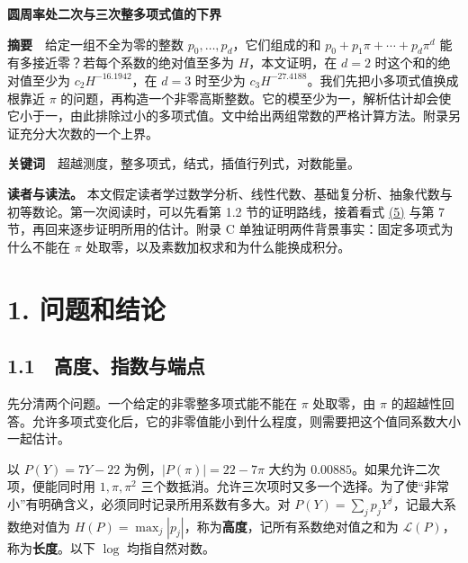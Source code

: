 \documentclass[11pt,a4paper]{article}
\begin{document}
\thispagestyle{plain}
\begin{center}{\LARGE\sffamily\bfseries\color{heading}圆周率处二次与三次整多项式值的下界\par}\vspace{.6em}{\large 本科生阐释版\par}\vspace{.35em}{\small 2026 年 11 月 19 日\par}\end{center}
\textbf{摘要}　给定一组不全为零的整数 \(p_0,\ldots,p_d\)，它们组成的和 \(p_0+p_1\pi+\cdots+p_d\pi^d\) 能有多接近零？若每个系数的绝对值至多为 \(H\)，本文证明，在 \(d=2\) 时这个和的绝对值至少为 \(c_2 H^{-16.1942}\)，在 \(d=3\) 时至少为 \(c_3 H^{-27.4188}\)。我们先把小多项式值换成根靠近 \(\pi\) 的问题，再构造一个非零高斯整数。它的模至少为一，解析估计却会使它小于一，由此排除过小的多项式值。文中给出两组常数的严格计算方法。附录另证充分大次数的一个上界。

\textbf{关键词}　超越测度，整多项式，结式，插值行列式，对数能量。

\textbf{读者与读法。} 本文假定读者学过数学分析、线性代数、基础复分析、抽象代数与初等数论。第一次阅读时，可以先看第 1.2 节的证明路线，接着看式 \hyperref[eq:5]{(5)} 与第 7 节，再回来逐步证明所用的估计。附录 C 单独证明两件背景事实：固定多项式为什么不能在 \(\pi\) 处取零，以及素数加权求和为什么能换成积分。

\medskip\tableofcontents\clearpage
\section{1. 问题和结论}\label{ux95eeux9898ux548cux7ed3ux8bba}

\subsection{1.1　高度、指数与端点}\label{ux9ad8ux5ea6ux6307ux6570ux4e0eux7aefux70b9}

先分清两个问题。一个给定的非零整多项式能不能在 \(\pi\) 处取零，由 \(\pi\) 的超越性回答。允许多项式变化后，它的非零值能小到什么程度，则需要把这个值同系数大小一起估计。

以 \(P(Y)=7Y-22\) 为例，\(|P(\pi)|=22-7\pi\) 大约为 \(0.00885\)。如果允许二次项，便能同时用 \(1,\pi,\pi^2\) 三个数抵消。允许三次项时又多一个选择。为了使``非常小''有明确含义，必须同时记录所用系数有多大。对 \(P(Y)=\sum_jp_jY^j\)，记最大系数绝对值为 \(H(P)=\max_j|p_j|\)，称为\textbf{高度}，记所有系数绝对值之和为 \(\mathcal L(P)\)，称为\textbf{长度}。以下 \(\log\) 均指自然对数。
\end{document}
